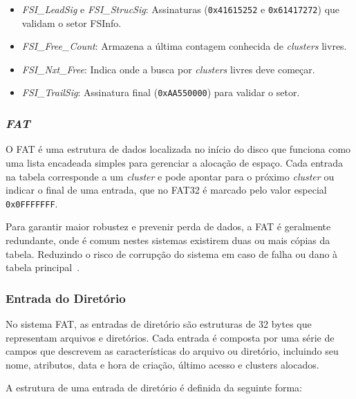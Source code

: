 \documentclass[
    12pt,				%
    oneside,   	        %
    a4paper,			%
    english,			%
    french,				%
    spanish,			%
    brazil,				%
    ]{pacotes/abntex2}
\begin{document}
\begin{itemize}
    \item \textit{FSI\_LeadSig} e \textit{FSI\_StrucSig}: Assinaturas (\texttt{0x41615252} e \texttt{0x61417272}) que validam o setor FSInfo.
    \item \textit{FSI\_Free\_Count}: Armazena a última contagem conhecida de \textit{clusters} livres.
    \item \textit{FSI\_Nxt\_Free}: Indica onde a busca por \textit{clusters} livres deve começar.
    \item \textit{FSI\_TrailSig}: Assinatura final (\texttt{0xAA550000}) para validar o setor.
\end{itemize}

\subsubsection{\textit{FAT}}
\label{subsubsec:fsinfo}

O FAT é uma estrutura de dados localizada no início do disco que funciona como uma lista encadeada simples para gerenciar a alocação de espaço. Cada entrada na tabela corresponde a um \textit{cluster} e pode apontar para o próximo \textit{cluster} ou indicar o final de uma entrada, que no FAT32 é marcado pelo valor especial \texttt{0x0FFFFFFF}.

Para garantir maior robustez e prevenir perda de dados, a FAT é geralmente redundante, onde é comum nestes sistemas existirem duas ou mais cópias da tabela. Reduzindo o risco de corrupção do sistema em caso de falha ou dano à tabela principal~\cite{microsoft2000}.

\subsubsection{Entrada do Diretório}
\label{subsubsec:dentry}

No sistema FAT, as entradas de diretório são estruturas de 32 bytes que representam arquivos e diretórios. Cada entrada é composta por uma série de campos que descrevem as características do arquivo ou diretório, incluindo seu nome, atributos, data e hora de criação, último acesso e clusters alocados.

A estrutura de uma entrada de diretório é definida da seguinte forma:
\end{document}
